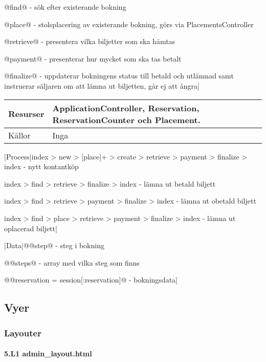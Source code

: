 \documentclass[a4paper, twoside, 11pt, titlepage]{article}
\begin{document}
			@find@ - sök efter existerande bokning

			@place@ - stolsplacering av existerande bokning, görs via PlacementsController

			@retrieve@ - presentera vilka biljetter som ska hämtas

			@payment@ - presenterar hur mycket som ska tas betalt

			@finalize@ - uppdaterar bokningens status till betald och utlämnad samt instruerar säljaren om att lämna ut biljetten, går ej att ångra|

			\begin {table} [ht] \begin{tabular} {  p{3.5cm} p{9.6cm} }
				\hline
				Resurser & ApplicationController, Reservation, ReservationCounter och Placement.  \\
				\hline
				Källor & Inga  \\
				\hline
			\end{tabular} \end{table} \FloatBarrier
			\vspace{6mm}

			|Process|index > new > [place]+ > create > retrieve > payment > finalize > index - nytt kontantköp

			index > find > retrieve > finalize > index - lämna ut betald biljett

			index > find > retrieve > payment > finalize > index - lämna ut obetald biljett

			index > find > place > retrieve > payment > finalize > index - lämna ut oplacerad biljett|

			|Data|@@step@ - steg i bokning

			@@steps@ - array med vilka steg som finns

			@@reservation = session[:reservation]@ - bokningsdata|

	\subsection{Vyer}



		\subsubsection{Layouter}



			\paragraph{5.L1 admin\_layout.html}\
\end{document}
